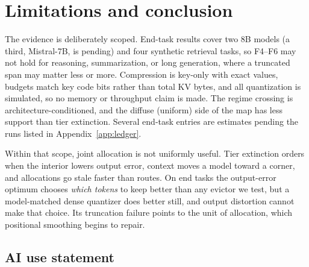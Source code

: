 \documentclass{article}
\theoremstyle{definition}
\begin{document}
\section{Limitations and conclusion}
\label{sec:conclusion}

The evidence is deliberately scoped.  End-task results cover two 8B models (a third, Mistral-7B, is pending) and four synthetic retrieval tasks, so F4--F6 may not hold for reasoning, summarization, or long generation, where a truncated span may matter less or more.  Compression is key-only with exact values, budgets match key code bits rather than total KV bytes, and all quantization is simulated, so no memory or throughput claim is made.  The regime crossing is architecture-conditioned, and the diffuse (uniform) side of the map has less support than tier extinction.  Several end-task entries are estimates pending the runs listed in Appendix~\ref{app:ledger}.

Within that scope, joint allocation is not uniformly useful.  Tier extinction orders when the interior lowers output error, context moves a model toward a corner, and allocations go stale faster than routes.  On end tasks the output-error optimum chooses \emph{which tokens} to keep better than any evictor we test, but a model-matched dense quantizer does better still, and output distortion cannot make that choice.  Its truncation failure points to the unit of allocation, which positional smoothing begins to repair.

\label{main:end}

\subsection*{AI use statement}
\end{document}
